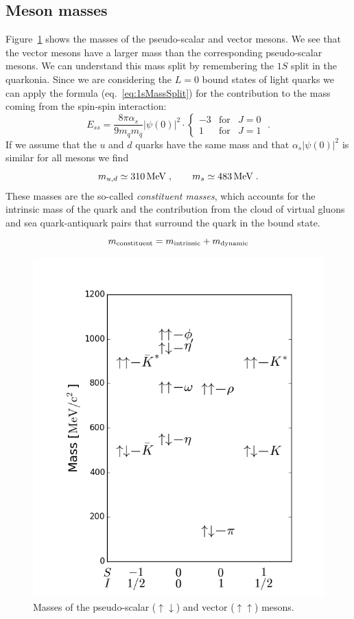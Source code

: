 \documentclass[12pt]{article}
\begin{document}
\subsection{Meson masses}
Figure~\ref{fig:mesonMasses} shows the masses of the pseudo-scalar and vector mesons. We see that the vector mesons have a larger mass than the corresponding pseudo-scalar mesons. We can understand this mass split by remembering the $1S$ split in the quarkonia. Since we are considering the $L=0$ bound states of light quarks we can apply the formula (eq.~\ref{eq:1sMassSplit}) for the contribution to the mass coming from the spin-spin interaction:
\[E_{ss}=\frac{8\pi \alpha_s }{9m_q m_{\bar q}}\left|\psi(0)\right|^2 \cdot\left\{\begin{array}{ccc}-3&\mbox{for}& J=0 \\ 1&\mbox{for}& J=1 \end{array}\right. \;.\] 
If we assume that the $u$ and $d$ quarks have the same mass and that $\alpha_s|\psi(0)|^2$ is similar for all mesons we find
\[
m_{u,d}\simeq 310\,{\rm MeV}\;,\qquad 
m_{s}\simeq 483\,{\rm MeV}\;. 
\]  
These masses are the so-called \emph{constituent masses}, which accounts for the intrinsic mass of the quark and the contribution from the cloud of virtual gluons and sea quark-antiquark pairs that surround the quark in the bound state. 
\[m_{\rm constituent}=m_{\rm intrinsic}+m_{\rm dynamic}\]
\begin{figure}
\begin{center}
\includegraphics[scale=0.5]{images/meson.png}
\end{center}
\caption{Masses of the pseudo-scalar ($\uparrow\downarrow$) and vector ($\uparrow\uparrow$) mesons.  }\label{fig:mesonMasses}
\end{figure}
\end{document}
